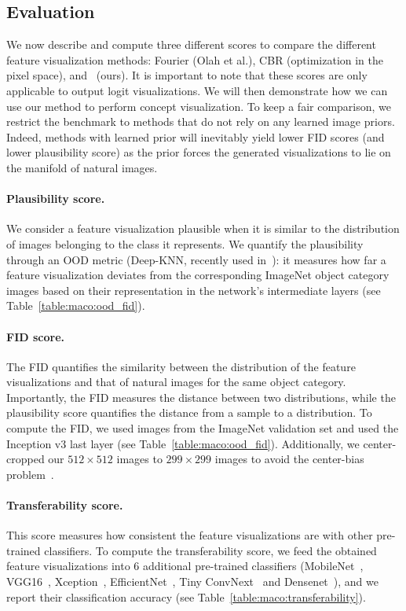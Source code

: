 \subsection{Evaluation}
\label{section:maco:evaluation}
We now describe and compute three different scores to compare the different feature visualization methods: Fourier (Olah et al.), CBR (optimization in the pixel space), and \magfv~(ours). It is important to note that these scores are only applicable to output logit visualizations. We will then demonstrate how we can use our method to perform concept visualization. %
To keep a fair comparison, we restrict the benchmark to methods that do not rely on any learned image priors. Indeed, methods with learned prior will inevitably yield lower FID scores (and lower plausibility score) as the prior forces the generated visualizations to lie on the manifold of natural images.




\paragraph*{Plausibility score.} We consider a feature visualization plausible when it is similar to the distribution of images belonging to the class it represents.
We quantify the plausibility through an OOD metric (Deep-KNN, recently used in~\cite{sun2022out}): it measures how far a feature visualization deviates from the corresponding ImageNet object category images based on their representation in the network's intermediate layers (see Table~\ref{table:maco:ood_fid}).



\paragraph{FID score.} The FID quantifies the similarity between the distribution of the feature visualizations and that of natural images for the same object category. Importantly, the FID measures the distance between two distributions, while the plausibility score quantifies the distance from a sample to a distribution. To compute the FID,  we used images from the ImageNet validation set and used the Inception v3 last layer (see Table~\ref{table:maco:ood_fid}). Additionally, we center-cropped our $512\times 512$ images to $299\times 299$ images to avoid the center-bias problem~\cite{nguyen2016multifaceted}.



\paragraph{Transferability score.} This score measures how consistent the feature visualizations are with other pre-trained classifiers. To compute the transferability score, we feed the obtained feature visualizations into 6 additional pre-trained classifiers (MobileNet~\cite{howard2017mobilenets}, VGG16~\cite{simonyan2014deep}, Xception~\cite{chollet2017xception}, EfficientNet~\cite{tan2019efficientnet}, Tiny ConvNext~\cite{liu2022convnet} and Densenet~\cite{huang2017densely}), and we report their classification accuracy (see Table~\ref{table:maco:transferability}).

